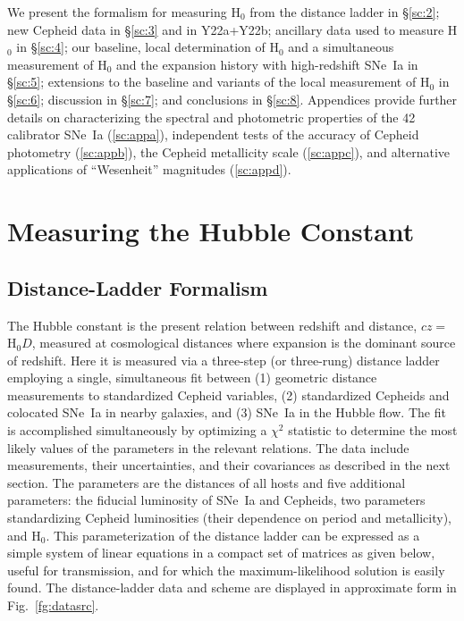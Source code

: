 \documentclass[12pt]{aastex631}
\begin{document}
We present the formalism for measuring H$_0$ from the distance ladder in \S\ref{sc:2}; new Cepheid data in \S\ref{sc:3} and in Y22a+Y22b; ancillary data used to measure H$_0$ in \S\ref{sc:4}; our baseline, local determination of H$_0$ and a simultaneous measurement of H$_0$ and the expansion history with high-redshift SNe~Ia in \S\ref{sc:5}; extensions to the baseline and variants of the local measurement of H$_0$ in \S\ref{sc:6}; discussion in \S\ref{sc:7}; and conclusions in \S\ref{sc:8}. Appendices provide further details on characterizing the spectral and photometric properties of the 42 calibrator SNe~Ia (\ref{sc:appa}),  independent tests of the accuracy of Cepheid photometry (\ref{sc:appb}), the Cepheid metallicity scale (\ref{sc:appc}), and alternative applications of ``Wesenheit'' magnitudes (\ref{sc:appd}).  

\section{Measuring the Hubble Constant\label{sc:2}}
\subsection{Distance-Ladder Formalism}

The Hubble constant is the present relation between redshift and distance, $cz=$ H$_0 D$, measured at cosmological distances where expansion is the dominant source of redshift.  Here it is measured via a three-step (or three-rung) distance ladder employing a single, simultaneous fit between (1) geometric distance measurements to standardized Cepheid variables, (2) standardized Cepheids and colocated SNe~Ia in nearby galaxies, and (3) SNe~Ia in the Hubble flow. The fit is accomplished simultaneously by optimizing a $\chi^2$ statistic to determine the most likely values of the parameters in the relevant relations.   The data include measurements, their uncertainties, and their covariances as described in the next section.  The parameters are the distances of all hosts and five additional parameters: the fiducial luminosity of SNe~Ia and Cepheids, two parameters standardizing Cepheid luminosities (their dependence on period and metallicity), and H$_0$. This parameterization of the distance ladder can be expressed as a simple system of linear equations in a compact set of matrices as given below, useful for transmission,  and for which the maximum-likelihood solution is easily found.  The distance-ladder data and scheme are displayed in approximate form in Fig.~\ref{fg:datasrc}. 
\end{document}
